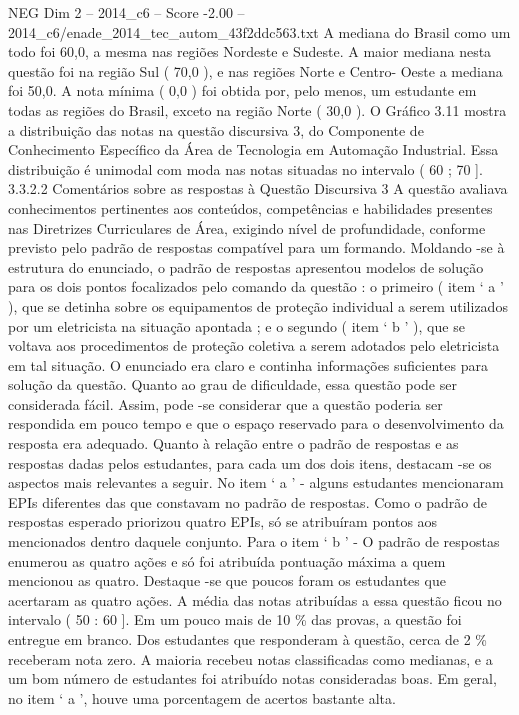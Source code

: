 \begin{textsample}{NEG Dim 2 – 2014\_c6 – Score -2.00 – 2014\_c6/enade\_2014\_tec\_autom\_43f2ddc563.txt}
A mediana do Brasil como um todo foi 60,0, a mesma nas regiões Nordeste e Sudeste.
A maior mediana nesta questão foi na região Sul ( 70,0 ), e nas regiões Norte e Centro- Oeste a mediana foi 50,0.
A nota mínima ( 0,0 ) foi obtida por, pelo menos, um estudante em todas as regiões do Brasil, exceto na região Norte ( 30,0 ).
O Gráfico 3.11 mostra a distribuição das notas na questão discursiva 3, do Componente de Conhecimento Específico da Área de Tecnologia em Automação Industrial.
Essa distribuição é unimodal com moda nas notas situadas no intervalo ( 60 ; 70 ]. 3.3.2.2 Comentários sobre as respostas à Questão Discursiva 3 A questão avaliava conhecimentos pertinentes aos conteúdos, competências e habilidades presentes nas Diretrizes Curriculares de Área, exigindo nível de profundidade, conforme previsto pelo padrão de respostas compatível para um formando.
Moldando -se à estrutura do enunciado, o padrão de respostas apresentou modelos de solução para os dois pontos focalizados pelo comando da questão : o primeiro ( item ‘ a ’ ), que se detinha sobre os equipamentos de proteção individual a serem utilizados por um eletricista na situação apontada ; e o segundo ( item ‘ b ’ ), que se voltava aos procedimentos de proteção coletiva a serem adotados pelo eletricista em tal situação.
O enunciado era claro e continha informações suficientes para solução da questão.
Quanto ao grau de dificuldade, essa questão pode ser considerada fácil.
Assim, pode -se considerar que a questão poderia ser respondida em pouco tempo e que o espaço reservado para o desenvolvimento da resposta era adequado.
Quanto à relação entre o padrão de respostas e as respostas dadas pelos estudantes, para cada um dos dois itens, destacam -se os aspectos mais relevantes a seguir.
No item ‘ a ’ - alguns estudantes mencionaram EPIs diferentes das que constavam no padrão de respostas.
Como o padrão de respostas esperado priorizou quatro EPIs, só se atribuíram pontos aos mencionados dentro daquele conjunto.
Para o item ‘ b ’ - O padrão de respostas enumerou as quatro ações e só foi atribuída pontuação máxima a quem mencionou as quatro.
Destaque -se que poucos foram os estudantes que acertaram as quatro ações.
A média das notas atribuídas a essa questão ficou no intervalo ( 50 : 60 ].
Em um pouco mais de 10 \% das provas, a questão foi entregue em branco.
Dos estudantes que responderam à questão, cerca de 2 \% receberam nota zero.
A maioria recebeu notas classificadas como medianas, e a um bom número de estudantes foi atribuído notas consideradas boas.
Em geral, no item ‘ a ’, houve uma porcentagem de acertos bastante alta.

\end{textsample}
